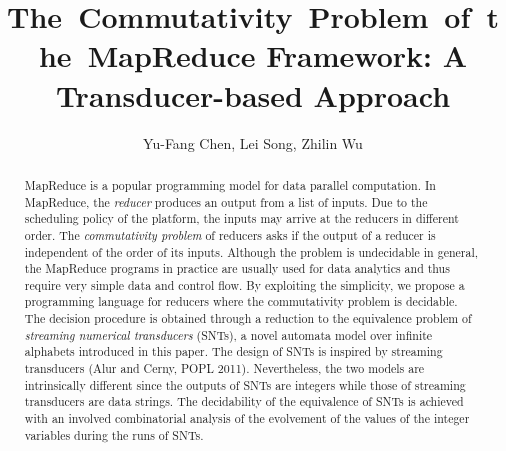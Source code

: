 \documentclass[runningheads,a4paper]{llncs}
\title{The~Commutativity~Problem~of~the~MapReduce Framework: A Transducer-based Approach}
\institute{Institute of Information Science, Academia Sinica \and State Key Laboratory of Computer Science,\\ Institute of Software, Chinese Academy of Sciences }
\author{Yu-Fang Chen\inst{1}, Lei Song\inst{2}, Zhilin Wu\inst{2}}
\begin{document}
\maketitle

\begin{abstract}

MapReduce is a popular programming model for data parallel computation. 
In MapReduce, the \emph{reducer} produces an output from a list of inputs. Due to the scheduling policy of the platform, the inputs may arrive at the reducers in different order. The \emph{commutativity problem} of reducers asks if the output of a reducer is independent of the order of its inputs. Although the problem is undecidable in general,
the MapReduce programs in practice are usually used for data analytics and thus require very simple data and control flow. 
By exploiting the simplicity, we propose a programming language for reducers where the commutativity problem is decidable.
The decision procedure is obtained through a reduction to the equivalence problem of \emph{streaming numerical transducers} (SNTs), a novel automata model over infinite alphabets introduced in this paper. The design of SNTs is inspired by streaming transducers (Alur and Cerny, POPL 2011). Nevertheless, the two models are intrinsically different since the outputs of SNTs are integers while those of streaming transducers are data strings. 
The decidability of the equivalence of SNTs is achieved with an involved combinatorial analysis of the evolvement of the values of the integer variables during the runs of SNTs.

\end{abstract}

\vspace{-0.8cm}


\vspace{-0.3cm}


\vspace{-0.3cm}


\vspace{-0.3cm}


\vspace{-0.3cm}



\vspace{-0.3cm}

\vspace{-0.2cm}

\vspace{-0.5cm}






%

\end{document}

